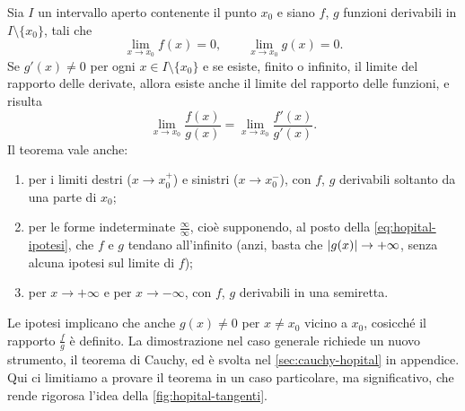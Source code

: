\begin{teorema}[di L'Hôpital]\label{teo:hopital}
Sia $I$ un intervallo aperto contenente il punto $x_{0}$ e siano $f$, $g$ funzioni
derivabili in $I\setminus\{x_{0}\}$, tali che
\begin{equation}\label{eq:hopital-ipotesi}
  \lim_{x\to x_{0}}f(x)=0, \qquad \lim_{x\to x_{0}}g(x)=0 .
\end{equation}
Se $g'(x)\neq0$ per ogni $x\in I\setminus\{x_{0}\}$ e se esiste, finito o infinito, il
limite del rapporto delle derivate, allora esiste anche il limite del rapporto delle
funzioni, e risulta
\begin{equation}\label{eq:hopital}
  \lim_{x\to x_{0}}\frac{f(x)}{g(x)}=\lim_{x\to x_{0}}\frac{f'(x)}{g'(x)} .
\end{equation}
Il teorema vale anche:
\begin{enumerate}[label=\textup{(\roman*)}]
  \item per i limiti destri ($x\to x_{0}^{+}$) e sinistri ($x\to x_{0}^{-}$), con $f$, $g$
  derivabili soltanto da una parte di $x_{0}$;
  \item per le forme indeterminate $\frac\infty\infty$, cioè supponendo, al posto della
  \eqref{eq:hopital-ipotesi}, che $f$ e $g$ tendano all'infinito (anzi, basta che
  $\lvert g(x)\rvert\to+\infty$, senza alcuna ipotesi sul limite di $f$);
  \item per $x\to+\infty$ e per $x\to-\infty$, con $f$, $g$ derivabili in una semiretta.
\end{enumerate}
\end{teorema}

\begin{schema}
\end{schema}

Le ipotesi implicano che anche $g(x)\neq0$ per $x\neq x_{0}$ vicino a $x_{0}$, cosicché
il rapporto $\frac{f}{g}$ è definito. La dimostrazione nel caso generale richiede un
nuovo strumento, il teorema di Cauchy, ed è svolta nel \cref{sec:cauchy-hopital} in
appendice. Qui ci limitiamo a provare il teorema in un caso particolare, ma
significativo, che rende rigorosa l'idea della \cref{fig:hopital-tangenti}.

